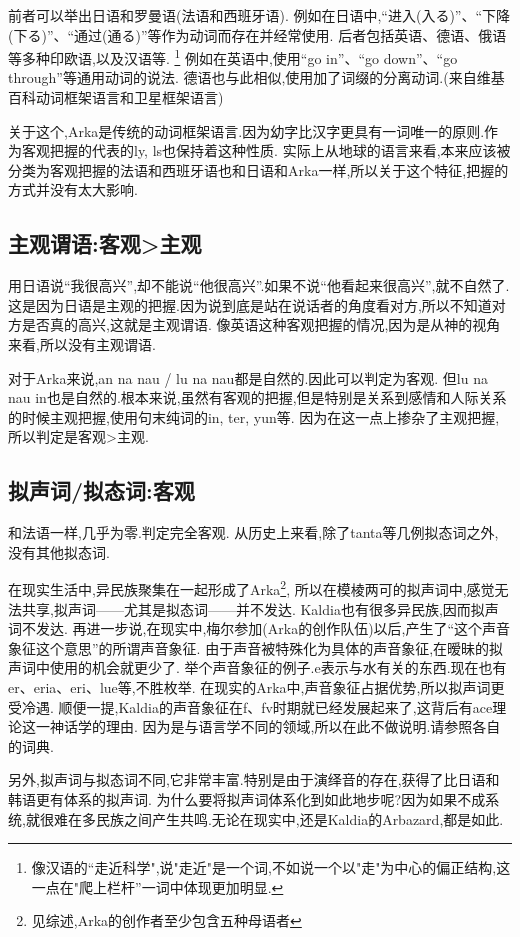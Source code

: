 前者可以举出日语和罗曼语(法语和西班牙语).
例如在日语中,“进入(入る)”、“下降(下る)”、“通过(通る)”等作为动词而存在并经常使用.
后者包括英语、德语、俄语等多种印欧语,以及汉语等.
\footnote{像汉语的``走近科学",说"走近"是一个词,不如说一个以"走"为中心的偏正结构,这一点在"爬上栏杆''一词中体现更加明显.}
例如在英语中,使用“go in”、“go down”、“go through”等通用动词的说法.
德语也与此相似,使用加了词缀的分离动词.(来自维基百科动词框架语言和卫星框架语言)

关于这个,Arka是传统的动词框架语言.因为幼字比汉字更具有一词唯一的原则.作为客观把握的代表的ly, ls也保持着这种性质.
实际上从地球的语言来看,本来应该被分类为客观把握的法语和西班牙语也和日语和Arka一样,所以关于这个特征,把握的方式并没有太大影响.

\subsection{主观谓语:客观>主观}

用日语说“我很高兴”,却不能说“他很高兴”.如果不说“他看起来很高兴”,就不自然了.
这是因为日语是主观的把握.因为说到底是站在说话者的角度看对方,所以不知道对方是否真的高兴,这就是主观谓语.
像英语这种客观把握的情况,因为是从神的视角来看,所以没有主观谓语.

对于Arka来说,an na nau / lu na nau都是自然的.因此可以判定为客观.
但lu na nau in也是自然的.根本来说,虽然有客观的把握,但是特别是关系到感情和人际关系的时候主观把握,使用句末纯词的in, ter, yun等.
因为在这一点上掺杂了主观把握,所以判定是客观>主观.
\subsection{拟声词/拟态词:客观}

和法语一样,几乎为零.判定完全客观.
从历史上来看,除了tanta等几例拟态词之外,没有其他拟态词.

在现实生活中,异民族聚集在一起形成了Arka\footnote{见综述,Arka的创作者至少包含五种母语者},
所以在模棱两可的拟声词中,感觉无法共享,拟声词——尤其是拟态词——并不发达.
Kaldia也有很多异民族,因而拟声词不发达.
再进一步说,在现实中,梅尔参加(Arka的创作队伍)以后,产生了“这个声音象征这个意思”的所谓声音象征.
由于声音被特殊化为具体的声音象征,在暧昧的拟声词中使用的机会就更少了.
举个声音象征的例子.e表示与水有关的东西.现在也有er、eria、eri、lue等,不胜枚举.
在现实的Arka中,声音象征占据优势,所以拟声词更受冷遇.
顺便一提,Kaldia的声音象征在f、fv时期就已经发展起来了,这背后有ace理论这一神话学的理由.
因为是与语言学不同的领域,所以在此不做说明.请参照各自的词典.

另外,拟声词与拟态词不同,它非常丰富.特别是由于演绎音的存在,获得了比日语和韩语更有体系的拟声词.
为什么要将拟声词体系化到如此地步呢?因为如果不成系统,就很难在多民族之间产生共鸣.无论在现实中,还是Kaldia的Arbazard,都是如此.

